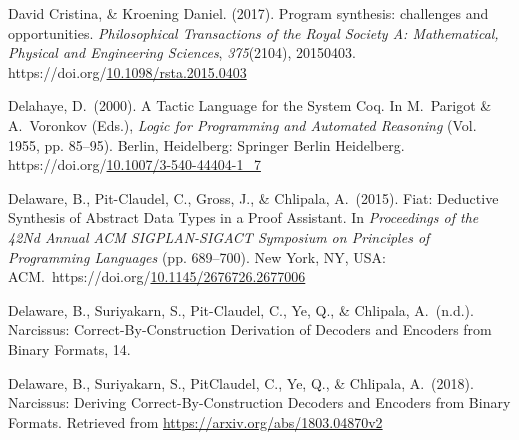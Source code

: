 \documentclass[12pt,twoside]{article}
\begin{document}
{\begin{thebibliography}{222}
\mdbibitemlabel{}David Cristina, \& Kroening Daniel. (2017). Program synthesis: challenges and opportunities. \emph{Philosophical Transactions of the Royal Society A: Mathematical, Physical and Engineering Sciences}, \emph{375}(2104), 20150403. https://doi.org/\href{https://dx.doi.org/10.1098/rsta.2015.0403}{10.1098/rsta.2015.0403}\label{david_cristina_program_2017}%

\mdbibitemlabel{}Delahaye, D.~(2000). A Tactic Language for the System Coq. In M.~Parigot \& A.~Voronkov (Eds.), \emph{Logic for Programming and Automated Reasoning} (Vol. 1955, pp. 85–95). Berlin, Heidelberg: Springer Berlin Heidelberg. https://doi.org/\href{https://dx.doi.org/10.1007/3-540-44404-1_7}{10.1007/3-540-44404-1\_7}\label{parigot_tactic_2000}%

\mdbibitemlabel{}Delaware, B., Pit-Claudel, C., Gross, J., \& Chlipala, A.~(2015). Fiat: Deductive Synthesis of Abstract Data Types in a Proof Assistant. In \emph{Proceedings of the 42Nd Annual ACM SIGPLAN-SIGACT Symposium on Principles of Programming Languages} (pp. 689–700). New York, NY, USA: ACM.~https://doi.org/\href{https://dx.doi.org/10.1145/2676726.2677006}{10.1145/2676726.2677006}\label{delaware_fiat:_2015}%

\mdbibitemlabel{}Delaware, B., Suriyakarn, S., Pit-Claudel, C., Ye, Q., \& Chlipala, A.~(n.d.). Narcissus: Correct-By-Construction Derivation of Decoders and Encoders from Binary Formats, 14.\label{delaware_narcissus:_nodate}%

\mdbibitemlabel{}Delaware, B., Suriyakarn, S., Pit\textendash{}Claudel, C., Ye, Q., \& Chlipala, A.~(2018). Narcissus: Deriving Correct-By-Construction Decoders and Encoders from Binary Formats. Retrieved from \href{https://arxiv.org/abs/1803.04870v2}{{\ttfamily https://\hspace{0pt}arxiv.\hspace{0pt}org/\hspace{0pt}abs/\hspace{0pt}1803.\hspace{0pt}04870v2}}\label{delaware_narcissus:_2018}%


\end{thebibliography}}
\end{document}
